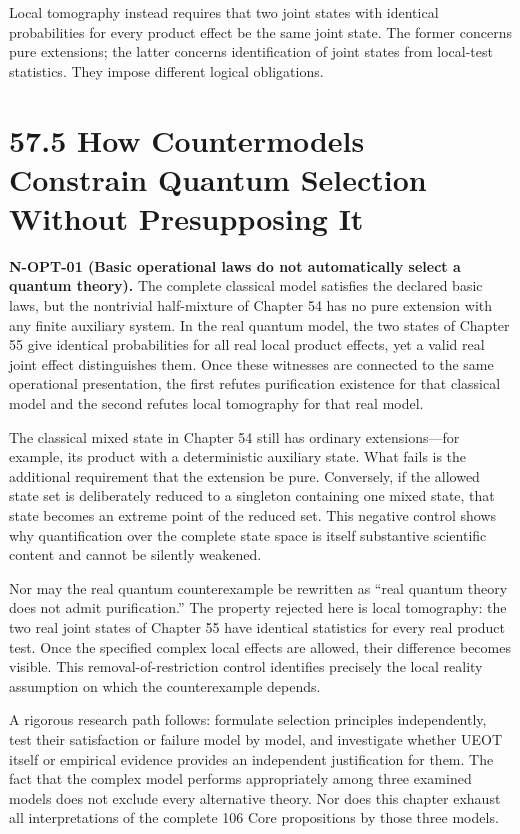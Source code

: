 \documentclass[
  11pt,
  oneside]{book}
\begin{document}
Local tomography instead requires that two joint states with identical
probabilities for every product effect be the same joint state. The
former concerns pure extensions; the latter concerns identification of
joint states from local-test statistics. They impose different logical
obligations.

\section{57.5 How Countermodels Constrain Quantum Selection Without
Presupposing It}

\label{n-opt-01}{}

\textbf{N-OPT-01 (Basic operational laws do not automatically select a
quantum theory).} The complete classical model satisfies the declared
basic laws, but the nontrivial half-mixture of Chapter 54 has no pure
extension with any finite auxiliary system. In the real quantum model,
the two states of Chapter 55 give identical probabilities for all real
local product effects, yet a valid real joint effect distinguishes them.
Once these witnesses are connected to the same operational presentation,
the first refutes purification existence for that classical model and
the second refutes local tomography for that real model.

The classical mixed state in Chapter 54 still has ordinary
extensions---for example, its product with a deterministic auxiliary
state. What fails is the additional requirement that the extension be
pure. Conversely, if the allowed state set is deliberately reduced to a
singleton containing one mixed state, that state becomes an extreme
point of the reduced set. This negative control shows why quantification
over the complete state space is itself substantive scientific content
and cannot be silently weakened.

Nor may the real quantum counterexample be rewritten as ``real quantum
theory does not admit purification.'' The property rejected here is
local tomography: the two real joint states of Chapter 55 have identical
statistics for every real product test. Once the specified complex local
effects are allowed, their difference becomes visible. This
removal-of-restriction control identifies precisely the local reality
assumption on which the counterexample depends.

A rigorous research path follows: formulate selection principles
independently, test their satisfaction or failure model by model, and
investigate whether UEOT itself or empirical evidence provides an
independent justification for them. The fact that the complex model
performs appropriately among three examined models does not exclude
every alternative theory. Nor does this chapter exhaust all
interpretations of the complete 106 Core propositions by those three
models.
\end{document}
